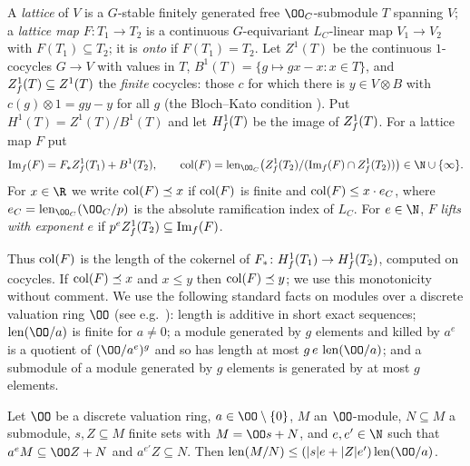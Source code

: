 \begin{definition}\label{pf:linkN-adm:def-col}
A \emph{lattice} of $V$ is a $G$-stable finitely generated free $\OO_C$-submodule $T$ spanning $V$; a \emph{lattice
map} $F\colon T_1\to T_2$ is a continuous $G$-equivariant $L_C$-linear map $V_1\to V_2$ with $F(T_1)\subseteq T_2$;
it is \emph{onto} if $F(T_1)=T_2$. Let $Z^1(T)$ be the continuous $1$-cocycles $G\to V$ with values in $T$,
$B^1(T)=\{g\mapsto gx-x:x\in T\}$, and $Z^1_{f}(T)\subseteq Z^1(T)$ the \emph{finite} cocycles: those $c$ for
which there is $y\in V\otimes B$ with $c(g)\otimes1=gy-y$ for all $g$ (the Bloch--Kato condition
\cite{BlochKato1990}). Put $H^1(T)=Z^1(T)/B^1(T)$ and let $H^1_{f}(T)$ be the image of $Z^1_{f}(T)$. For
a lattice map $F$ put
\[
\linkNadmIm(F)=F_*\linkNadmZf(T_1)+B^1(T_2),\qquad
\linkNadmcol(F)=\linkNadmlen_{\OO_C}\bigl(\linkNadmZf(T_2)/(\linkNadmIm(F)\cap\linkNadmZf(T_2))\bigr)\in\N\cup\{\infty\}.
\]
For $x\in\R$ we write $\operatorname{col}(F)\preceq x$ if $\operatorname{col}(F)$ is finite and
$\operatorname{col}(F)\le x\cdot e_C$, where $e_C=\linkNadmlen_{\OO_C}(\OO_C/p)$ is the absolute ramification index of
$L_C$. For $e\in\N$, $F$ \emph{lifts with exponent} $e$ if $p^eZ^1_{f}(T_2)\subseteq\operatorname{Im}_f(F)$.
\end{definition}

Thus $\operatorname{col}(F)$ is the length of the cokernel of $F_*\colon H^1_{f}(T_1)\to H^1_{f}(T_2)$, computed
on cocycles. If $\operatorname{col}(F)\preceq x$ and $x\le y$ then $\operatorname{col}(F)\preceq y$; we use this monotonicity
without comment. We use the following standard facts on modules over a discrete valuation ring $\OO$ (see e.g.\
\cite{Matsumura1989}): length is additive in short exact sequences; $\linkNadmlen(\OO/a)$ is finite for $a\ne0$; a
module generated by $g$ elements and killed by $a^e$ is a quotient of $(\OO/a^e)^g$ and so has length at most
$g\,e\,\linkNadmlen(\OO/a)$; and a submodule of a module generated by $g$ elements is generated by at most $g$ elements.

\begin{lemma}\label{pf:linkN-adm:twostep}
Let $\OO$ be a discrete valuation ring, $a\in\OO\setminus\{0\}$, $M$ an $\OO$-module, $N\subseteq M$ a submodule,
$s,Z\subseteq M$ finite sets with $M=\OO s+N$, and $e,e'\in\N$ such that $a^eM\subseteq\OO Z+N$ and
$a^{e'}Z\subseteq N$. Then $\linkNadmlen(M/N)\le(|s|e+|Z|e')\linkNadmlen(\OO/a)$.
\end{lemma}

